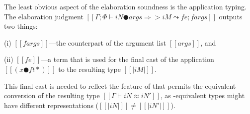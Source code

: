The least obvious aspect of the elaboration soundness is the application typing.
The elaboration judgment $[[Γ ; Φ ⊢ iN ● args ⇒> iM ⤳ fe; fargs]]$ 
outputs two things: 
\begin{enumerate*}
  \item [(i)] $[[fargs]]$---the \systemf counterpart of the argument list $[[args]]$, and 
  \item [(ii)] $[[fe]]$---a \systemf term that is used for the final cast 
    of the application $[[(x ● ft *)]]$ to the resulting type $[[|iM|]]$.
\end{enumerate*}
This final cast is needed to 
reflect the \fexists feature of 
that permits the equivalent conversion of the resulting type $[[Γ ⊢ iN ≈ iN']]$,
as \fexists-equivalent types
might have different \systemf representations (\ie $[[|iN|]] \neq [[|iN'|]]$).




